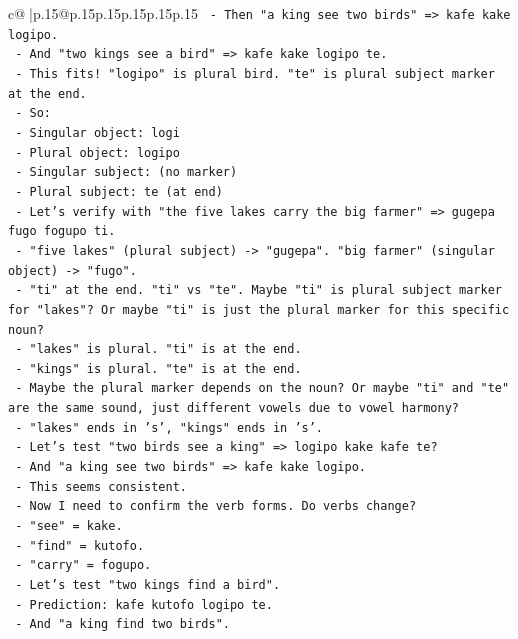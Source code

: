 \documentclass{article}
\begin{document}
{\begin{supertabular}{c@{$\;$}|p{.15\linewidth}@{}p{.15\linewidth}p{.15\linewidth}p{.15\linewidth}p{.15\linewidth}p{.15\linewidth}}
{{{\texttt{  {-} Then "a king see two birds" => kafe kake logipo.} \\
\texttt{  {-} And "two kings see a bird" => kafe kake logipo te.} \\
\texttt{  {-} This fits! "logipo" is plural bird. "te" is plural subject marker at the end.} \\
\texttt{  {-} So:} \\
\texttt{    {-} Singular object: logi} \\
\texttt{    {-} Plural object: logipo} \\
\texttt{    {-} Singular subject: (no marker)} \\
\texttt{    {-} Plural subject: te (at end)} \\
\texttt{  {-} Let's verify with "the five lakes carry the big farmer" => gugepa fugo fogupo ti.} \\
\texttt{  {-} "five lakes" (plural subject) {-}> "gugepa". "big farmer" (singular object) {-}> "fugo".} \\
\texttt{  {-} "ti" at the end. "ti" vs "te". Maybe "ti" is plural subject marker for "lakes"? Or maybe "ti" is just the plural marker for this specific noun?} \\
\texttt{  {-} "lakes" is plural. "ti" is at the end.} \\
\texttt{  {-} "kings" is plural. "te" is at the end.} \\
\texttt{  {-} Maybe the plural marker depends on the noun? Or maybe "ti" and "te" are the same sound, just different vowels due to vowel harmony?} \\
\texttt{  {-} "lakes" ends in 's', "kings" ends in 's'.} \\
\texttt{  {-} Let's test "two birds see a king" => logipo kake kafe te?} \\
\texttt{  {-} And "a king see two birds" => kafe kake logipo.} \\
\texttt{  {-} This seems consistent.} \\
\texttt{  {-} Now I need to confirm the verb forms. Do verbs change?} \\
\texttt{  {-} "see" = kake.} \\
\texttt{  {-} "find" = kutofo.} \\
\texttt{  {-} "carry" = fogupo.} \\
\texttt{  {-} Let's test "two kings find a bird".} \\
\texttt{  {-} Prediction: kafe kutofo logipo te.} \\
\texttt{  {-} And "a king find two birds".} \\
}}}
\end{supertabular}}
\end{document}
